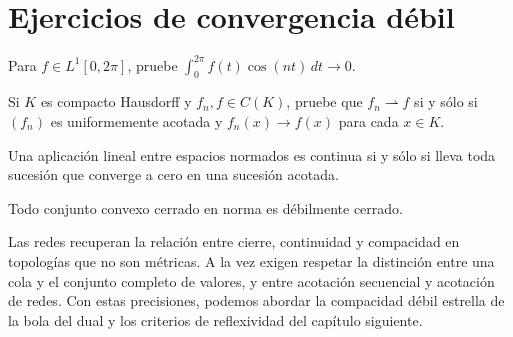\section{Ejercicios de convergencia débil}
\begin{ejercicio}\label{ej:v3-l15-1}
Para $f\in L^1[0,2\pi]$, pruebe $\int_0^{2\pi}f(t)\cos(nt)\,dt\to0$.
\end{ejercicio}


\begin{ejercicio}\label{ej:v3-l15-2}
Si $K$ es compacto Hausdorff y $f_n,f\in C(K)$, pruebe que $f_n\rightharpoonup f$ si y sólo si $(f_n)$ es uniformemente acotada y $f_n(x)\to f(x)$ para cada $x\in K$.
\end{ejercicio}


\begin{ejercicio}\label{ej:v3-l15-3}
Una aplicación lineal entre espacios normados es continua si y sólo si lleva toda sucesión que converge a cero en una sucesión acotada.
\end{ejercicio}


\begin{ejercicio}\label{ej:v3-l15-4}
Todo conjunto convexo cerrado en norma es débilmente cerrado.
\end{ejercicio}


Las redes recuperan la relación entre cierre, continuidad y compacidad en topologías que no son métricas. A la vez exigen respetar la distinción entre una cola y el conjunto completo de valores, y entre acotación secuencial y acotación de redes. Con estas precisiones, podemos abordar la compacidad débil estrella de la bola del dual y los criterios de reflexividad del capítulo siguiente.
